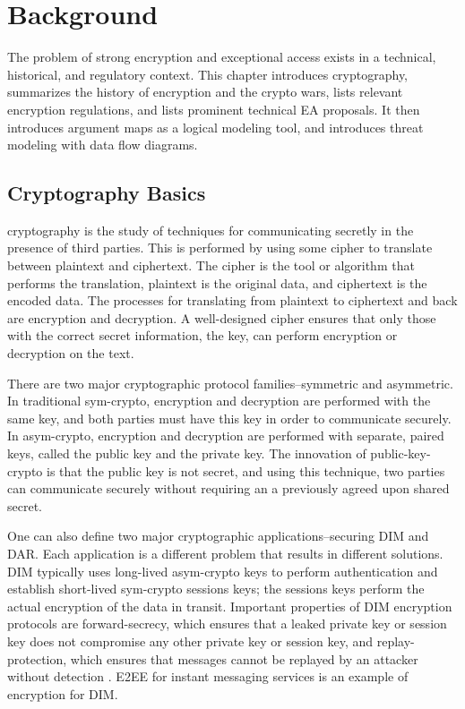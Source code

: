 \chapter{Background}
\label{chap-background}

The problem of strong encryption and exceptional access exists in a technical, historical, and regulatory context. This
chapter introduces cryptography, summarizes the history of encryption and the crypto wars, lists relevant encryption
regulations, and lists prominent technical \ac{EA} proposals. It then introduces argument maps as a logical modeling
tool, and introduces threat modeling with data flow diagrams.



\section{Cryptography Basics}
\label{sec-crypto-basics}

\Ac{cryptography} is the study of techniques for communicating secretly in the presence of third parties. This is
performed by using some \ac{cipher} to translate between \ac{plaintext} and \ac{ciphertext}. The cipher is the tool or
algorithm that performs the translation, plaintext is the original data, and ciphertext is the encoded data. The
processes for translating from plaintext to ciphertext and back are \ac{encryption} and \ac{decryption}. A well-designed
cipher ensures that only those with the correct secret information, the \ac{key}, can perform encryption or decryption
on the text.


There are two major cryptographic protocol families--symmetric and asymmetric. In traditional \ac{sym-crypto},
encryption and decryption are performed with the same key, and both parties must have this key in order to communicate
securely. In \ac{asym-crypto}, encryption and decryption are performed with separate, paired keys, called the public key
and the private key. The innovation of \ac{public-key-crypto} is that the public key is not secret, and using this
technique, two parties can communicate securely without requiring an a previously agreed upon shared secret.

One can also define two major cryptographic applications--securing \acf{DIM} and \acf{DAR}. Each application is a
different problem that results in different solutions. \Ac{DIM} typically uses long-lived \ac{asym-crypto} keys to
perform authentication and establish short-lived \ac{sym-crypto} sessions keys; the sessions keys perform the actual
encryption of the data in transit. Important properties of \ac{DIM} encryption protocols are \ac{forward-secrecy}, which
ensures that a leaked private key or session key does not compromise any other private key or session key, and
\ac{replay-protection}, which ensures that messages cannot be replayed by an attacker without detection
\cite{bellovin_thinking_2016}. \Ac{E2EE} for instant messaging services is an example of encryption for \ac{DIM}.

